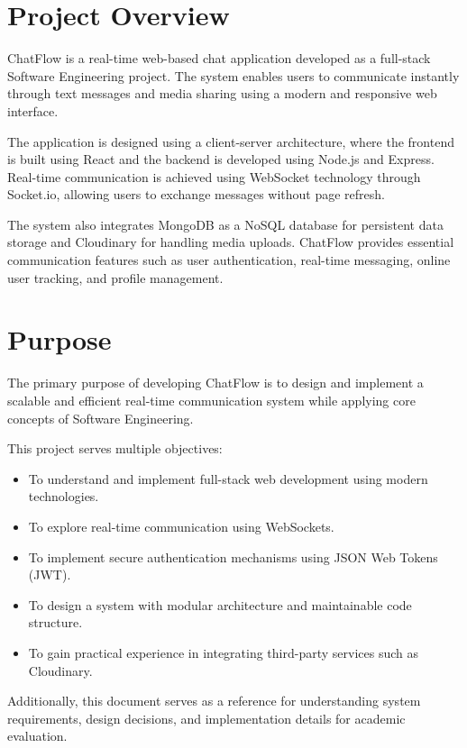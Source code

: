 \documentclass[12pt,a4paper]{report}
\begin{document}
\section{Project Overview}

ChatFlow is a real-time web-based chat application developed as a full-stack Software Engineering project. The system enables users to communicate instantly through text messages and media sharing using a modern and responsive web interface. 

The application is designed using a client-server architecture, where the frontend is built using React and the backend is developed using Node.js and Express. Real-time communication is achieved using WebSocket technology through Socket.io, allowing users to exchange messages without page refresh.

The system also integrates MongoDB as a NoSQL database for persistent data storage and Cloudinary for handling media uploads. ChatFlow provides essential communication features such as user authentication, real-time messaging, online user tracking, and profile management.

\section{Purpose}

The primary purpose of developing ChatFlow is to design and implement a scalable and efficient real-time communication system while applying core concepts of Software Engineering.

This project serves multiple objectives:

\begin{itemize}
    \item To understand and implement full-stack web development using modern technologies.
    \item To explore real-time communication using WebSockets.
    \item To implement secure authentication mechanisms using JSON Web Tokens (JWT).
    \item To design a system with modular architecture and maintainable code structure.
    \item To gain practical experience in integrating third-party services such as Cloudinary.
\end{itemize}

Additionally, this document serves as a reference for understanding system requirements, design decisions, and implementation details for academic evaluation.
\end{document}
